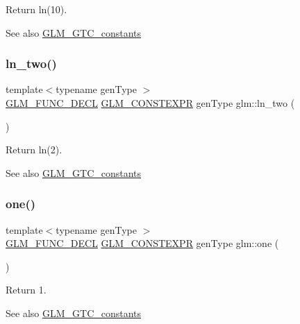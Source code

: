 Return ln(10). \begin{DoxySeeAlso}{See also}
\hyperlink{group__gtc__constants}{G\+L\+M\+\_\+\+G\+T\+C\+\_\+constants} 
\end{DoxySeeAlso}
\mbox{\label{group__gtc__constants_ga24f4d27765678116f41a2f336ab7975c}} 
\subsubsection{\texorpdfstring{ln\+\_\+two()}{ln\_two()}}
{\footnotesize\ttfamily template$<$typename gen\+Type $>$ \\
\hyperlink{setup_8hpp_ab2d052de21a70539923e9bcbf6e83a51}{G\+L\+M\+\_\+\+F\+U\+N\+C\+\_\+\+D\+E\+CL} \hyperlink{setup_8hpp_a08b807947b47031d3a511f03f89645ad}{G\+L\+M\+\_\+\+C\+O\+N\+S\+T\+E\+X\+PR} gen\+Type glm\+::ln\+\_\+two (\begin{DoxyParamCaption}{ }\end{DoxyParamCaption})}

Return ln(2). \begin{DoxySeeAlso}{See also}
\hyperlink{group__gtc__constants}{G\+L\+M\+\_\+\+G\+T\+C\+\_\+constants} 
\end{DoxySeeAlso}
\mbox{\label{group__gtc__constants_ga39c2fb227631ca25894326529bdd1ee5}} 
\subsubsection{\texorpdfstring{one()}{one()}}
{\footnotesize\ttfamily template$<$typename gen\+Type $>$ \\
\hyperlink{setup_8hpp_ab2d052de21a70539923e9bcbf6e83a51}{G\+L\+M\+\_\+\+F\+U\+N\+C\+\_\+\+D\+E\+CL} \hyperlink{setup_8hpp_a08b807947b47031d3a511f03f89645ad}{G\+L\+M\+\_\+\+C\+O\+N\+S\+T\+E\+X\+PR} gen\+Type glm\+::one (\begin{DoxyParamCaption}{ }\end{DoxyParamCaption})}

Return 1. \begin{DoxySeeAlso}{See also}
\hyperlink{group__gtc__constants}{G\+L\+M\+\_\+\+G\+T\+C\+\_\+constants} 
\end{DoxySeeAlso}
\mbox{\label{group__gtc__constants_ga555150da2b06d23c8738981d5013e0eb}} 

